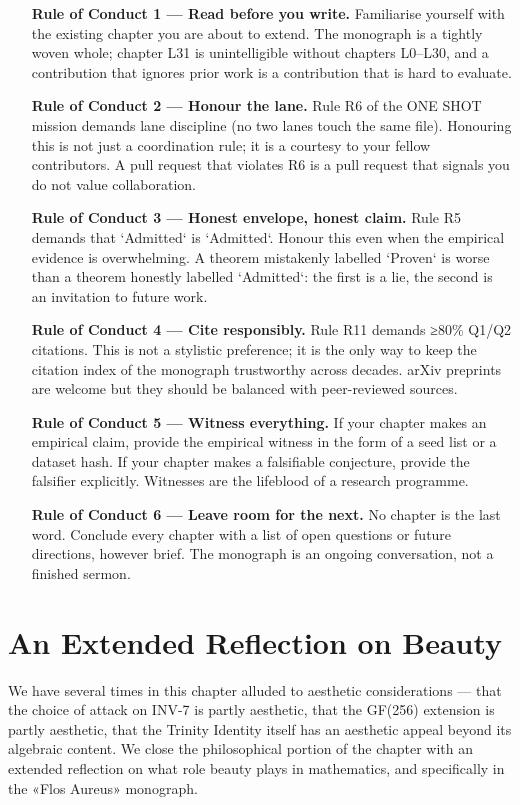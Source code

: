\begin{enumerate}
    \item[\textbf{Rule of Conduct 1 — Read before you write.}] Familiarise yourself with the existing chapter you are about to extend. The monograph is a tightly woven whole; chapter L31 is unintelligible without chapters L0–L30, and a contribution that ignores prior work is a contribution that is hard to evaluate.
    \item[\textbf{Rule of Conduct 2 — Honour the lane.}] Rule R6 of the ONE SHOT mission demands lane discipline (no two lanes touch the same file). Honouring this is not just a coordination rule; it is a courtesy to your fellow contributors. A pull request that violates R6 is a pull request that signals you do not value collaboration.
    \item[\textbf{Rule of Conduct 3 — Honest envelope, honest claim.}] Rule R5 demands that `Admitted` is `Admitted`. Honour this even when the empirical evidence is overwhelming. A theorem mistakenly labelled `Proven` is worse than a theorem honestly labelled `Admitted`: the first is a lie, the second is an invitation to future work.
    \item[\textbf{Rule of Conduct 4 — Cite responsibly.}] Rule R11 demands ≥80\% Q1/Q2 citations. This is not a stylistic preference; it is the only way to keep the citation index of the monograph trustworthy across decades. arXiv preprints are welcome but they should be balanced with peer-reviewed sources.
    \item[\textbf{Rule of Conduct 5 — Witness everything.}] If your chapter makes an empirical claim, provide the empirical witness in the form of a seed list or a dataset hash. If your chapter makes a falsifiable conjecture, provide the falsifier explicitly. Witnesses are the lifeblood of a research programme.
    \item[\textbf{Rule of Conduct 6 — Leave room for the next.}] No chapter is the last word. Conclude every chapter with a list of open questions or future directions, however brief. The monograph is an ongoing conversation, not a finished sermon.
\end{enumerate}

\section{An Extended Reflection on Beauty}
\label{sec:31-beauty-extended}

We have several times in this chapter alluded to aesthetic considerations — that the choice of attack on INV-7 is partly aesthetic, that the GF(256) extension is partly aesthetic, that the Trinity Identity itself has an aesthetic appeal beyond its algebraic content. We close the philosophical portion of the chapter with an extended reflection on what role beauty plays in mathematics, and specifically in the «Flos Aureus» monograph.

